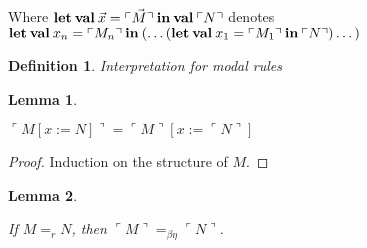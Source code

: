 \documentclass[a4paper]{article}
\newtheorem{lemma}{Lemma}
\newtheorem{defin}{Definition}
\begin{document}
Where ${\bf let \: val \:} \vec{x} = \ulcorner \vec{M} \urcorner {\: \bf in \:} {\bf val \:} \ulcorner N \urcorner$ denotes
${\bf let \: val \:} x_n = \ulcorner M_n \urcorner {\: \bf in \:} (\dots ({\bf let \: val \:} x_1 = \ulcorner M_1 \urcorner {\bf \: in \: } \ulcorner N \urcorner) \dots)$

\begin{defin} Interpretation for modal rules
  \begin{prooftree}
  \end{prooftree}

  \begin{prooftree}
  \end{prooftree}
\end{defin}

\begin{lemma}
  $ $

  $\ulcorner M [x := N] \urcorner = \ulcorner M \urcorner [x := \ulcorner N \urcorner]$
\end{lemma}

\begin{proof}
  Induction on the structure of $M$.
\end{proof}

\begin{lemma}
  $ $

  If $M =_{r} N$, then $\ulcorner M \urcorner =_{\beta \eta} \ulcorner N \urcorner$.
\end{lemma}
\end{document}
